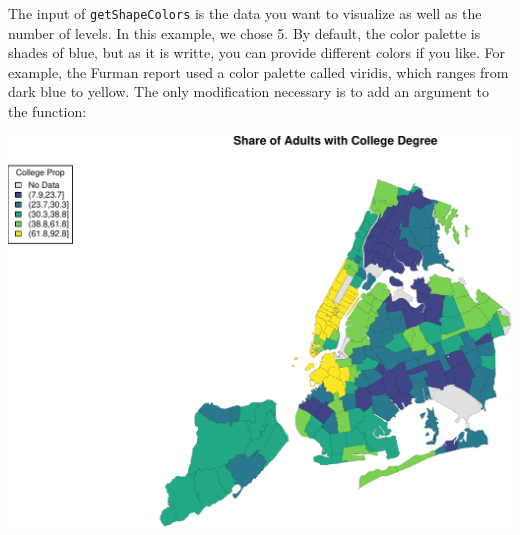 \documentclass[openany]{book}
\newenvironment{Shaded}{\begin{snugshade}}{\end{snugshade}}
\newcommand{\DataTypeTok}[1]{\textcolor[rgb]{0.13,0.29,0.53}{#1}}
\newcommand{\DecValTok}[1]{\textcolor[rgb]{0.00,0.00,0.81}{#1}}
\newcommand{\FloatTok}[1]{\textcolor[rgb]{0.00,0.00,0.81}{#1}}
\newcommand{\KeywordTok}[1]{\textcolor[rgb]{0.13,0.29,0.53}{\textbf{#1}}}
\newcommand{\NormalTok}[1]{#1}
\newcommand{\OperatorTok}[1]{\textcolor[rgb]{0.81,0.36,0.00}{\textbf{#1}}}
\newcommand{\StringTok}[1]{\textcolor[rgb]{0.31,0.60,0.02}{#1}}
\begin{document}
The input of \texttt{getShapeColors} is the data you want to visualize as well as the number of levels. In this example, we chose 5. By default, the color palette is shades of blue, but as it is writte, you can provide different colors if you like. For example, the Furman report used a color palette called viridis, which ranges from dark blue to yellow. The only modification necessary is to add an argument to the function:

\begin{Shaded}
\end{Shaded}

\begin{center}\includegraphics[width=0.9\linewidth]{figs/unnamed-chunk-90-1} \end{center}
\end{document}
